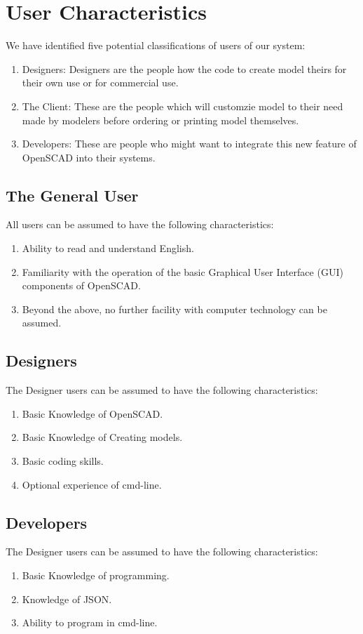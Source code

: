 \section{User Characteristics}

We have identified five potential classifications of users of our system:

\begin{enumerate}
    \item Designers: Designers are the people how the code to create model theirs for their own use or for commercial use.
    \item The Client: These are the people which will customzie model to their need made by modelers before ordering or printing model themselves.
    \item Developers: These are people who might want to integrate this new feature of OpenSCAD into their systems.
   
\end{enumerate}

\subsection{The General User}

All users can be assumed to have the following characteristics:

\begin{enumerate}
    \item Ability to read and understand English.
    \item Familiarity with the operation of the basic Graphical User Interface (GUI) components of OpenSCAD.
    \item Beyond the above, no further facility with computer technology can be assumed.
\end{enumerate}

\subsection{Designers}
The Designer users can be assumed to have the following characteristics:
\begin{enumerate}
    \item Basic Knowledge of OpenSCAD.
    \item Basic Knowledge of Creating models.
    \item Basic coding skills.
    \item Optional experience of cmd-line.
\end{enumerate}

\subsection{Developers}
The Designer users can be assumed to have the following characteristics:
\begin{enumerate}
    \item Basic Knowledge of programming.
    \item Knowledge of JSON.
    \item Ability to program in cmd-line.
\end{enumerate}
